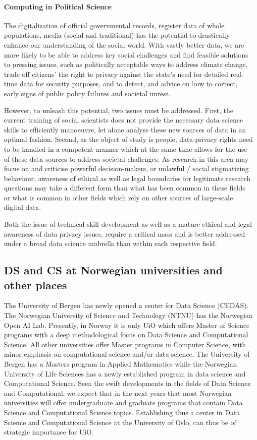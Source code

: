 \documentclass[a4paper,10pt]{article}
\begin{document}
\paragraph{Computing in Political Science}
 The digitalization of official governmental records, register data of whole populations, media (social and traditional) has the potential to drastically enhance our understanding of the social world. With vastly better data, we are more likely to be able to address key social challenges and find feasible solutions to pressing issues, such as politically acceptable ways to address climate change, trade off citizens’ the right to privacy against the state’s need for detailed real-time data for security purposes, and to detect, and advice on how to correct, early signs of public policy failures and societal unrest. 

However, to unleash this potential, two issues must be addressed. First, the current training of social scientists does not provide the necessary data science skills to efficiently manoeuvre, let alone analyse these new sources of data in an optimal fashion. Second, as the object of study is people, data-privacy rights need to be handled in a competent manner which at the same time allows for the use of these data sources to address societal challenges. As research in this area may focus on and criticise powerful decision-makers, or unlawful / social stigmatizing behaviour, awareness of ethical as well as legal boundaries for legitimate research questions may take a different form than what has been common in these fields or what is common in other fields which rely on other sources of large-scale digital data. 

Both the issue of technical skill development as well as a mature ethical and legal awareness of data privacy issues, require a critical mass and is better addressed under a broad data science umbrella than within each respective field.  



\subsection{DS and CS at Norwegian universities and other places}

The University of Bergen has newly opened a center for Data Science (CEDAS). The Norwegian University of Science and Technology (NTNU) has the Norwegian Open AI Lab. Presently,
in Norway it is only UiO which offers Master of Science programs with a deep methodological focus on Data Science and Computational Science. All other universities offer  Master programs in Computer Science, with minor emphasis on computational science and/or data science. The University of Bergen has a Masters program in Applied Mathematics while the Norwegian University of Life Sciences has a newly established program in data science and  Computational Science. Seen the swift developments in the fields of Data Science and Computational, we expect that in the next years that most Norwegian universities will offer undergraduate and graduate programs that contain Data Science and Computational Science topics. 
Establishing thus a center in Data Science and Computational Science at the University of Oslo, can thus be of strategic importance for UiO.
\end{document}
